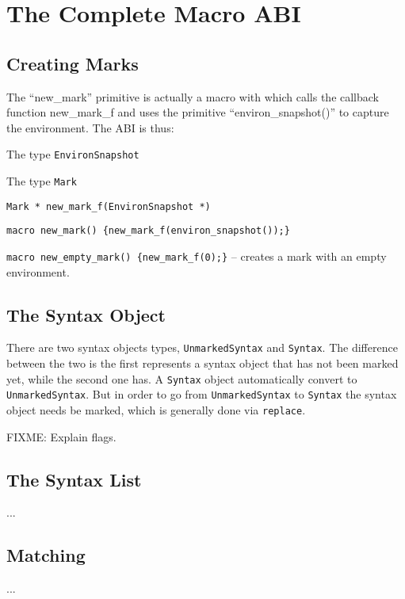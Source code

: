 \documentclass[12pt,english,letterpaper]{article}
\begin{document}
\section{The Complete Macro ABI}

\subsection{Creating Marks}

The ``new\_mark'' primitive is actually a macro with which calls the
callback function new\_mark\_f and uses the primitive
``environ\_snapshot()'' to capture the environment.  The ABI is thus:

\begin{itemize*}
\item The type \verb/EnvironSnapshot/
\item The type \verb/Mark/
\item \verb/Mark * new_mark_f(EnvironSnapshot *)/
\item \verb/macro new_mark() {new_mark_f(environ_snapshot());}/
\item \verb/macro new_empty_mark() {new_mark_f(0);}/ --
      creates a mark with an empty environment.
\end{itemize*}

\subsection{The Syntax Object}

There are two syntax objects types, \verb/UnmarkedSyntax/ and
\verb/Syntax/.  The difference between the two is the first represents
a syntax object that has not been marked yet, while the second one
has.  A \verb/Syntax/ object automatically convert to
\verb/UnmarkedSyntax/.  But in order to go from \verb/UnmarkedSyntax/
to \verb/Syntax/ the syntax object needs be marked, which is generally
done via \verb/replace/.

FIXME: Explain flags.

\subsection{The Syntax List}

...

\subsection{Matching}

...
\end{document}
